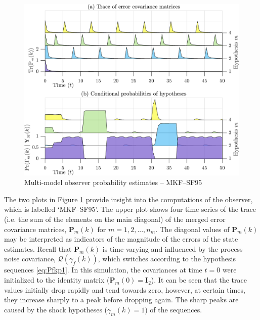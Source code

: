 \begin{figure}[htp]
	\centering
	\includegraphics[width=12cm]{images/rod_MKF_test_sim_MKF_SF95_prob.png}
	\caption{Multi-model observer probability estimates – MKF--SF95}
	\label{fig:rod-obs-sim-test-probs-SF95}
\end{figure}
The two plots in Figure \ref{fig:rod-obs-sim-test-probs-SF95} provide insight into the computations of the observer, which is labelled `MKF--SF95'. The upper plot shows four time series of the trace (i.e. the sum of the elements on the main diagonal) of the merged error covariance matrices, $\mathbf{P}_m(k)$ for $m=1,2,...,n_m$. The diagonal values of $\mathbf{P}_m(k)$ may be interpreted as indicators of the magnitude of the errors of the state estimates. Recall that $\mathbf{P}_m(k)$ is time-varying and influenced by the process noise covariance, $\mathcal{Q}(\gamma_f(k))$, which switches according to the hypothesis sequences \eqref{eq:Pfkp1}. In this simulation, the covariances at time $t=0$ were initialized to the identity matrix ($\mathbf{P}_m(0)=\mathbf{I}_2$). It can be seen that the trace values initially drop rapidly and tend towards zero, however, at certain times, they increase sharply to a peak before dropping again. The sharp peaks are caused by the shock hypotheses ($\gamma_m(k)=1$) of the sequences.

